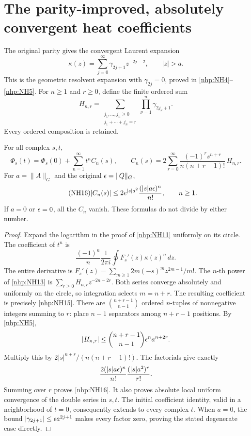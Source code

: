 \documentclass[11pt]{article}
\begin{document}
\section{The parity-improved, absolutely convergent heat coefficients}

The original parity gives the convergent Laurent expansion
\begin{equation}\tag{NH13}\label{nhp:NH13}
\kappa(z)=\sum_{j=0}^\infty
\gamma_{2j+1}z^{-2j-2},\qquad |z|>a .
\end{equation}
This is the geometric resolvent expansion with
\(\gamma_{2j}=0\), proved in \eqref{nhp:NH4}--\eqref{nhp:NH5}.
For \(n\ge1\) and \(r\ge0\), define the finite ordered sum
\begin{equation}\tag{NH14}\label{nhp:NH14}
H_{n,r}=
\sum_{\substack{j_1,\ldots,j_n\ge0\\j_1+\cdots+j_n=r}}
\prod_{\nu=1}^n\gamma_{2j_\nu+1}.
\end{equation}
Every ordered composition is retained.

\begin{nhptheorem}
For all complex \(s,t\),
\begin{equation}\tag{NH15}\label{nhp:NH15}
\Phi_s(t)=\Phi_s(0)+\sum_{n=1}^\infty t^n C_n(s),\qquad
C_n(s)=2\sum_{r=0}^\infty
\frac{(-1)^r s^{n+r}}{n(n+r-1)!}\,H_{n,r}.
\end{equation}
For \(a=\|A\|_G\) and the original \(\epsilon=\|Q\|_G\),
\begin{equation}\tag{NH16}\label{nhp:NH16}
|C_n(s)|\le
2e^{|s|a^2}\frac{(|s|a\epsilon)^n}{n!},\qquad n\ge1.
\end{equation}
If \(a=0\) or \(\epsilon=0\), all the \(C_n\) vanish.
These formulas do not divide by either number.
\end{nhptheorem}
\begin{proof}
Expand the logarithm in the proof of \eqref{nhp:NH11}
uniformly on its circle. The coefficient of \(t^n\) is
\[
\frac{(-1)^n}{n}\frac1{2\pi i}
\oint F_s'(z)\kappa(z)^n\,dz .
\]
The entire derivative is
\(F_s'(z)=\sum_{m\ge1}2m(-s)^m z^{2m-1}/m!\).
The \(n\)-th power of \eqref{nhp:NH13} is
\(\sum_{r\ge0}H_{n,r}z^{-2n-2r}\).
Both series converge absolutely and uniformly on the
circle, so integration selects \(m=n+r\).
The resulting coefficient is precisely \eqref{nhp:NH15}.
There are \(\binom{n+r-1}{n-1}\) ordered \(n\)-tuples
of nonnegative integers summing to \(r\): place \(n-1\)
separators among \(n+r-1\) positions. By \eqref{nhp:NH5},
\[
|H_{n,r}|\le
\binom{n+r-1}{n-1}\epsilon^n a^{n+2r}.
\]
Multiply this by \(2|s|^{n+r}/(n(n+r-1)!)\).
The factorials give exactly
\[
\frac{2(|s|a\epsilon)^n}{n!}\frac{(|s|a^2)^r}{r!}.
\]
Summing over \(r\) proves \eqref{nhp:NH16}.
It also proves absolute local uniform convergence of the
double series in \(s,t\). The initial coefficient identity,
valid in a neighborhood of \(t=0\), consequently extends
to every complex \(t\). When \(a=0\), the bound
\(|\gamma_{2j+1}|\le\epsilon a^{2j+1}\) makes every factor
zero, proving the stated degenerate case directly.
\end{proof}
\end{document}
